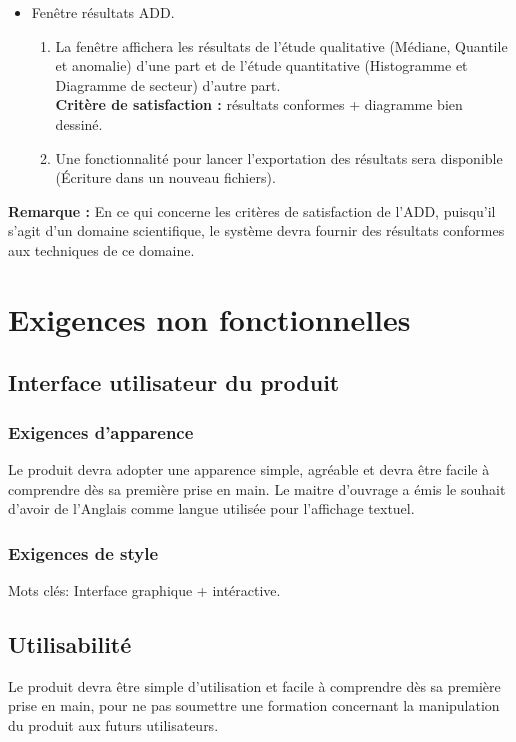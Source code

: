 \begin{itemize}
\begin{enumerate}
				\end{enumerate}
			\item Fenêtre résultats ADD.
				\begin{enumerate}
				\item La fenêtre affichera les résultats de l'étude qualitative (Médiane, Quantile et anomalie) d'une part et de l'étude quantitative (Histogramme et Diagramme de secteur) d'autre part.\\
				\textbf{Critère de satisfaction : } résultats conformes + diagramme bien dessiné. 
				\item Une fonctionnalité pour lancer l'exportation des résultats sera disponible (Écriture dans un nouveau fichiers).
				\end{enumerate}
			\end{itemize}
			
			\textbf{Remarque :} En ce qui concerne les critères de satisfaction de l'ADD, puisqu'il s'agit d'un domaine scientifique, le système devra fournir des résultats conformes aux techniques de ce domaine.
	
	
	\section{Exigences non fonctionnelles}
		\subsection{Interface utilisateur du produit}
		
			\subsubsection{Exigences d’apparence} 
			Le produit devra adopter une apparence simple, agréable et devra être facile à comprendre dès sa première prise en main.
			Le maitre d’ouvrage a émis le souhait d’avoir de l’Anglais comme langue utilisée pour l’affichage textuel.

			\subsubsection{Exigences de style}
			Mots clés: Interface graphique + intéractive.

		\subsection{Utilisabilité}
		Le produit devra être simple d’utilisation et facile à comprendre dès sa première prise en main, pour ne pas soumettre une formation concernant la manipulation du produit aux futurs utilisateurs.
		

